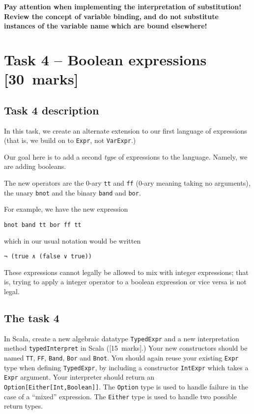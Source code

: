 \documentclass[11pt]{article}
\begin{document}
\begin{center}
\textbf{Pay attention when implementing the interpretation of substitution!}
\textbf{Review the concept of variable binding,}
\textbf{and do not substitute instances of the variable name}
\textbf{which are bound elsewhere!}
\end{center}

\section*{Task 4 – Boolean expressions           [30 marks]}
\label{sec:orgf538b4e}
\subsection*{Task 4 description}
\label{sec:org3594328}
In this task, we create an alternate extension to
our first language of expressions
(that is, we build on to \texttt{Expr}, not \texttt{VarExpr}.)

Our goal here is to add
a second \emph{type} of expressions to the language.
Namely, we are adding booleans.

The new operators are
the 0-ary \texttt{tt} and \texttt{ff} (0-ary meaning taking no arguments),
the unary \texttt{bnot} and the binary \texttt{band} and \texttt{bor}.

For example, we have the new expression
\begin{verbatim}
bnot band tt bor ff tt
\end{verbatim}
which in our usual notation would be written
\begin{verbatim}
¬ (true ∧ (false ∨ true))
\end{verbatim}

These expressions cannot legally be allowed to mix
with integer expressions; that is,
trying to apply a integer operator to a boolean expression
or vice versa is not legal.

\subsection*{The task 4}
\label{sec:orge50db25}
In Scala, create a new algebraic datatype \texttt{TypedExpr} and a new
interpretation method \texttt{typedInterpret} in Scala ([15 marks].)
Your new constructors should be named \texttt{TT}, \texttt{FF}, \texttt{Band}, \texttt{Bor} and \texttt{Bnot}.
You should again reuse your existing \texttt{Expr} type when defining \texttt{TypedExpr},
by including a constructor \texttt{IntExpr} which takes a \texttt{Expr} argument.
Your interpreter should return an \texttt{Option[Either[Int,Boolean]]}.
The \texttt{Option} type is used to handle failure in the case
of a “mixed” expression.
The \texttt{Either} type is used to handle two possible return types.
\end{document}

